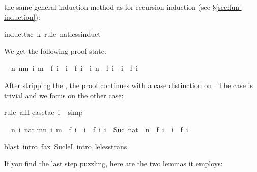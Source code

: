 \begin{isabellebody}
\begin{isamarkuptxt}
the same general induction method as for recursion induction (see
\S\ref{sec:fun-induction}):%
\end{isamarkuptxt}%
\isamarkuptrue%
\isamarkupfalse%
{\isacharparenleft}induct{\isacharunderscore}tac\ k\ rule{\isacharcolon}\ nat{\isacharunderscore}less{\isacharunderscore}induct{\isacharparenright}%
\begin{isamarkuptxt}%
\noindent
We get the following proof state:
\begin{isabelle}%
\ {}{\isachardot}\ {\isasymAnd}n{\isachardot}\ {\isasymforall}m{\isacharless}n{\isachardot}\ {\isasymforall}i{\isachardot}\ m\ {\isacharequal}\ f\ i\ {\isasymlongrightarrow}\ i\ {\isasymle}\ f\ i\ {\isasymLongrightarrow}\ {\isasymforall}i{\isachardot}\ n\ {\isacharequal}\ f\ i\ {\isasymlongrightarrow}\ i\ {\isasymle}\ f\ i%
\end{isabelle}
After stripping the , the proof continues with a case
distinction on . The case  is trivial and we focus on
the other case:%
\end{isamarkuptxt}%
\isamarkuptrue%
\isamarkupfalse%
{\isacharparenleft}rule\ allI{\isacharparenright}\isanewline
{}\isamarkupfalse%
{\isacharparenleft}case{\isacharunderscore}tac\ i{\isacharparenright}\isanewline
\ \isamarkupfalse%
{\isacharparenleft}simp{\isacharparenright}%
\begin{isamarkuptxt}%
\begin{isabelle}%
\ {}{\isachardot}\ {\isasymAnd}n\ i\ nat{\isachardot}\isanewline
{}m{\isacharless}n{\isachardot}\ {\isasymforall}i{\isachardot}\ m\ {\isacharequal}\ f\ i\ {\isasymlongrightarrow}\ i\ {\isasymle}\ f\ i{\isacharsemicolon}\ i\ {\isacharequal}\ Suc\ nat{\isasymrbrakk}\ {\isasymLongrightarrow}\ n\ {\isacharequal}\ f\ i\ {\isasymlongrightarrow}\ i\ {\isasymle}\ f\ i%
\end{isabelle}%
\end{isamarkuptxt}%
\isamarkuptrue%
\isamarkupfalse%
{\isacharparenleft}blast\ intro{\isacharbang}{\isacharcolon}\ f{\isacharunderscore}ax\ Suc{\isacharunderscore}leI\ intro{\isacharcolon}\ le{\isacharunderscore}less{\isacharunderscore}trans{\isacharparenright}%
\endisatagproof
{\isafoldproof}%
%
\isadelimproof
%
\endisadelimproof
%
\begin{isamarkuptext}%
\noindent
If you find the last step puzzling, here are the two lemmas it employs:

\end{isamarkuptext}
\end{isabellebody}
